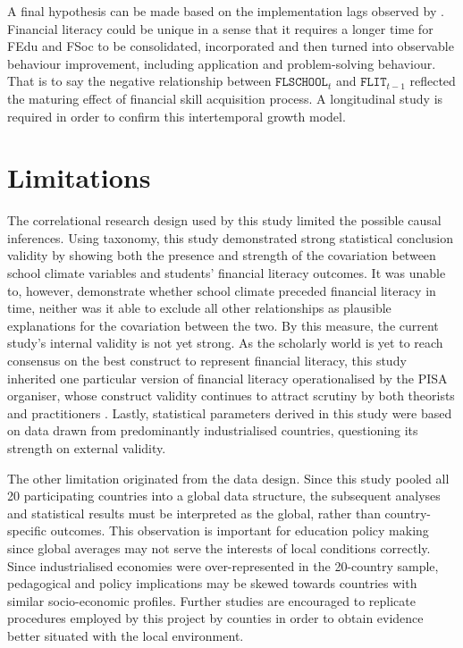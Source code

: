 \documentclass[a4paper,11pt,UKenglish,twoside,openright]{report}\usepackage[]{graphicx}\usepackage[]{color}
\begin{document}
A final hypothesis can be made based on the implementation lags observed by \textcite{bernheim:2001}. Financial literacy could be unique in a sense that it requires a longer time for FEdu and FSoc to be consolidated, incorporated and then turned into observable behaviour improvement, including application and problem-solving behaviour. That is to say the negative relationship between $\texttt{FLSCHOOL}_t$ and $\texttt{FLIT}_{t-1}$ reflected the maturing effect of financial skill acquisition process. A longitudinal study is required in order to confirm this intertemporal growth model.

\section{Limitations}

The correlational research design used by this study limited the possible causal inferences. Using  taxonomy, this study demonstrated strong statistical conclusion validity by showing both the presence and strength of the covariation between school climate variables and students' financial literacy outcomes. It was unable to, however, demonstrate whether school climate preceded financial literacy in time, neither was it able to exclude all other relationships as plausible explanations for the covariation between the two. By this measure, the current study's internal validity is not yet strong. As the scholarly world is yet to reach consensus on the best construct to represent financial literacy, this study inherited one particular version of financial literacy operationalised by the PISA organiser, whose construct validity continues to attract scrutiny by both theorists and practitioners \parencite{schuhen:2014}. Lastly, statistical parameters derived in this study were based on data drawn from predominantly industrialised countries, questioning its strength on external validity.

The other limitation originated from the data design. Since this study pooled all 20 participating countries into a global data structure, the subsequent analyses and statistical results must be interpreted as the global, rather than country-specific outcomes. This observation is important for education policy making since global averages may not serve the interests of local conditions correctly. Since industrialised economies were over-represented in the 20-country sample, pedagogical and policy implications may be skewed towards countries with similar socio-economic profiles. Further studies are encouraged to replicate procedures employed by this project by counties in order to obtain evidence better situated with the local environment.
\end{document}
